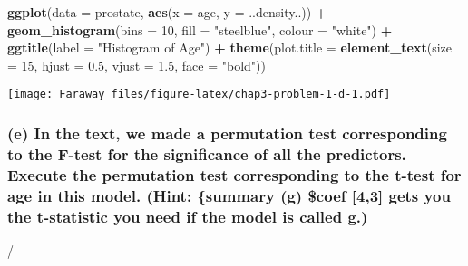 \documentclass[
]{article}
\newenvironment{Shaded}{\begin{snugshade}}{\end{snugshade}}
\newcommand{\DataTypeTok}[1]{\textcolor[rgb]{0.13,0.29,0.53}{#1}}
\newcommand{\DecValTok}[1]{\textcolor[rgb]{0.00,0.00,0.81}{#1}}
\newcommand{\FloatTok}[1]{\textcolor[rgb]{0.00,0.00,0.81}{#1}}
\newcommand{\KeywordTok}[1]{\textcolor[rgb]{0.13,0.29,0.53}{\textbf{#1}}}
\newcommand{\NormalTok}[1]{#1}
\newcommand{\OperatorTok}[1]{\textcolor[rgb]{0.81,0.36,0.00}{\textbf{#1}}}
\newcommand{\StringTok}[1]{\textcolor[rgb]{0.31,0.60,0.02}{#1}}
\begin{document}
\begin{Shaded}
\begin{Highlighting}[]
\KeywordTok{ggplot}\NormalTok{(}\DataTypeTok{data =}\NormalTok{ prostate, }\KeywordTok{aes}\NormalTok{(}\DataTypeTok{x =}\NormalTok{ age, }\DataTypeTok{y =}\NormalTok{ ..density..)) }\OperatorTok{+}
\StringTok{  }\KeywordTok{geom_histogram}\NormalTok{(}\DataTypeTok{bins =} \DecValTok{10}\NormalTok{, }\DataTypeTok{fill =} \StringTok{"steelblue"}\NormalTok{, }\DataTypeTok{colour =} \StringTok{"white"}\NormalTok{) }\OperatorTok{+}
\StringTok{  }\KeywordTok{ggtitle}\NormalTok{(}\DataTypeTok{label =} \StringTok{"Histogram of Age"}\NormalTok{) }\OperatorTok{+}
\StringTok{  }\KeywordTok{theme}\NormalTok{(}\DataTypeTok{plot.title =} \KeywordTok{element_text}\NormalTok{(}\DataTypeTok{size =} \DecValTok{15}\NormalTok{, }\DataTypeTok{hjust =} \FloatTok{0.5}\NormalTok{, }\DataTypeTok{vjust =} \FloatTok{1.5}\NormalTok{, }\DataTypeTok{face =} \StringTok{"bold"}\NormalTok{))}
\end{Highlighting}
\end{Shaded}

\texttt{[image: Faraway\_files/figure-latex/chap3-problem-1-d-1.pdf]}

\hypertarget{e-in-the-text-we-made-a-permutation-test-corresponding-to-the-f-test-for-the-significance-of-all-the-predictors.-execute-the-permutation-test-corresponding-to-the-t-test-for-age-in-this-model.-hint-summary-g-coef-43-gets-you-the-t-statistic-you-need-if-the-model-is-called-g.}{%
\subsubsection{(e) In the text, we made a permutation test corresponding
to the F-test for the significance of all the predictors. Execute the
permutation test corresponding to the t-test for age in this model.
(Hint: \{summary (g) \$coef {[}4,3{]} gets you the t-statistic you need
if the model is called
g.)}\label{e-in-the-text-we-made-a-permutation-test-corresponding-to-the-f-test-for-the-significance-of-all-the-predictors.-execute-the-permutation-test-corresponding-to-the-t-test-for-age-in-this-model.-hint-summary-g-coef-43-gets-you-the-t-statistic-you-need-if-the-model-is-called-g.}}

/
\end{document}
